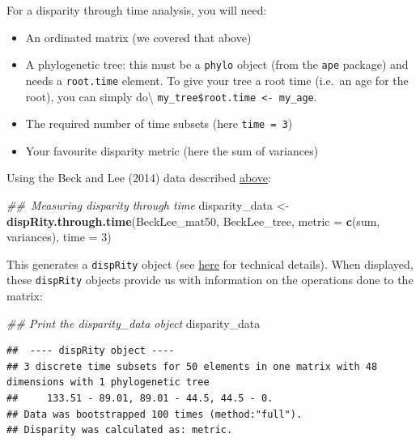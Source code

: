 \documentclass[]{book}
\newenvironment{Shaded}{\begin{snugshade}}{\end{snugshade}}
\newcommand{\CommentTok}[1]{\textcolor[rgb]{0.56,0.35,0.01}{\textit{#1}}}
\newcommand{\DataTypeTok}[1]{\textcolor[rgb]{0.13,0.29,0.53}{#1}}
\newcommand{\DecValTok}[1]{\textcolor[rgb]{0.00,0.00,0.81}{#1}}
\newcommand{\KeywordTok}[1]{\textcolor[rgb]{0.13,0.29,0.53}{\textbf{#1}}}
\newcommand{\NormalTok}[1]{#1}
\newcommand{\StringTok}[1]{\textcolor[rgb]{0.31,0.60,0.02}{#1}}
\providecommand{\tightlist}{%
  \setlength{\itemsep}{0pt}\setlength{\parskip}{0pt}}
\begin{document}
For a disparity through time analysis, you will need:

\begin{itemize}
\tightlist
\item
  An ordinated matrix (we covered that above)
\item
  A phylogenetic tree: this must be a \texttt{phylo} object (from the \texttt{ape} package) and needs a \texttt{root.time} element. To give your tree a root time (i.e.~an age for the root), you can simply do\textbackslash{} \texttt{my\_tree\$root.time\ \textless{}-\ my\_age}.
\item
  The required number of time subsets (here \texttt{time\ =\ 3})
\item
  Your favourite disparity metric (here the sum of variances)
\end{itemize}

Using the Beck and Lee (2014) data described \protect\hyperlink{example-data}{above}:

\begin{Shaded}
\begin{Highlighting}[]
\CommentTok{## Measuring disparity through time}
\NormalTok{disparity_data <-}\StringTok{ }\KeywordTok{dispRity.through.time}\NormalTok{(BeckLee_mat50, BeckLee_tree,}
                                        \DataTypeTok{metric =} \KeywordTok{c}\NormalTok{(sum, variances),}
                                        \DataTypeTok{time =} \DecValTok{3}\NormalTok{)}
\end{Highlighting}
\end{Shaded}

This generates a \texttt{dispRity} object (see \protect\hyperlink{guts}{here} for technical details).
When displayed, these \texttt{dispRity} objects provide us with information on the operations done to the matrix:

\begin{Shaded}
\begin{Highlighting}[]
\CommentTok{## Print the disparity_data object}
\NormalTok{disparity_data}
\end{Highlighting}
\end{Shaded}

\begin{verbatim}
##  ---- dispRity object ---- 
## 3 discrete time subsets for 50 elements in one matrix with 48 dimensions with 1 phylogenetic tree
##     133.51 - 89.01, 89.01 - 44.5, 44.5 - 0.
## Data was bootstrapped 100 times (method:"full").
## Disparity was calculated as: metric.
\end{verbatim}
\end{document}
